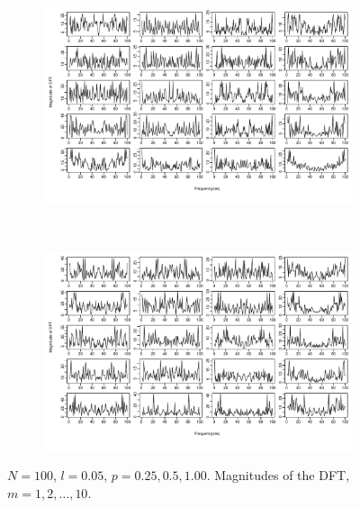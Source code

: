 \documentclass[11pt, a4paper]{article} %
\begin{document}
\begin{figure}
\begin{subfigure}{1.1\textwidth}
  \centering
  \includegraphics[width=\linewidth]{N100_MagnDFT_l005_m_1_5.pdf}
  \label{fig:sfig1}
\end{subfigure}\\
\begin{subfigure}{1.1\textwidth}
  \centering
  \includegraphics[width=\linewidth]{N100_MagnDFT_l005_m_6_10.pdf}
  \label{fig:sfig2}
\end{subfigure}
\label{fig1}
\caption{$N = 100$, $l =0.05$, $p = 0.25, 0.5, 1.00$. Magnitudes of the DFT, $m = 1,2, \dots, 10$.}
\end{figure}

\restoregeometry




\end{document}
